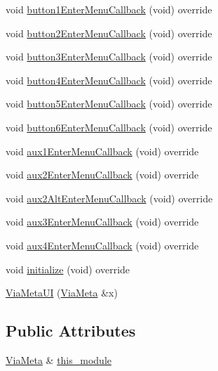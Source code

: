 \begin{DoxyCompactItemize}
\item 
void \mbox{\hyperlink{class_via_meta_1_1_via_meta_u_i_a5e9d82c9c06759dd2cc3b48846e594f2}{button1\+Enter\+Menu\+Callback}} (void) override
\item 
void \mbox{\hyperlink{class_via_meta_1_1_via_meta_u_i_a5687d94232ddf1b109a5f48c8ef89650}{button2\+Enter\+Menu\+Callback}} (void) override
\item 
void \mbox{\hyperlink{class_via_meta_1_1_via_meta_u_i_abff70e527b92121c207699c8c8334ee6}{button3\+Enter\+Menu\+Callback}} (void) override
\item 
void \mbox{\hyperlink{class_via_meta_1_1_via_meta_u_i_aef07210c32f8147e6b5ab92b923347e9}{button4\+Enter\+Menu\+Callback}} (void) override
\item 
void \mbox{\hyperlink{class_via_meta_1_1_via_meta_u_i_af14bee3824185ab5a97d8745e9317370}{button5\+Enter\+Menu\+Callback}} (void) override
\item 
void \mbox{\hyperlink{class_via_meta_1_1_via_meta_u_i_a5bcffdfe679b51dbcac0e78dc093c29b}{button6\+Enter\+Menu\+Callback}} (void) override
\item 
void \mbox{\hyperlink{class_via_meta_1_1_via_meta_u_i_a84e9b3d83d81753db095d67dee1fe8b9}{aux1\+Enter\+Menu\+Callback}} (void) override
\item 
void \mbox{\hyperlink{class_via_meta_1_1_via_meta_u_i_a31e89fca82851581b9ad7161cd81c6c0}{aux2\+Enter\+Menu\+Callback}} (void) override
\item 
void \mbox{\hyperlink{class_via_meta_1_1_via_meta_u_i_ab0ccbc22f2460565456b8347d18634b8}{aux2\+Alt\+Enter\+Menu\+Callback}} (void) override
\item 
void \mbox{\hyperlink{class_via_meta_1_1_via_meta_u_i_a31f9a7e08ee2d77d7aa96b644369e92d}{aux3\+Enter\+Menu\+Callback}} (void) override
\item 
void \mbox{\hyperlink{class_via_meta_1_1_via_meta_u_i_aa6309c2403a8436cc3ec222f7914b202}{aux4\+Enter\+Menu\+Callback}} (void) override
\item 
void \mbox{\hyperlink{class_via_meta_1_1_via_meta_u_i_ac2bc1bfeb6ef0045d234bd5b89f9ec99}{initialize}} (void) override
\item 
\mbox{\hyperlink{class_via_meta_1_1_via_meta_u_i_aa99917558f8467b7658347f461326add}{Via\+Meta\+UI}} (\mbox{\hyperlink{class_via_meta}{Via\+Meta}} \&x)
\end{DoxyCompactItemize}
\subsection*{Public Attributes}
\begin{DoxyCompactItemize}
\item 
\mbox{\hyperlink{class_via_meta}{Via\+Meta}} \& \mbox{\hyperlink{class_via_meta_1_1_via_meta_u_i_a8798ab0a875a443e05fc0954d849742c}{this\+\_\+module}}
\end{DoxyCompactItemize}


